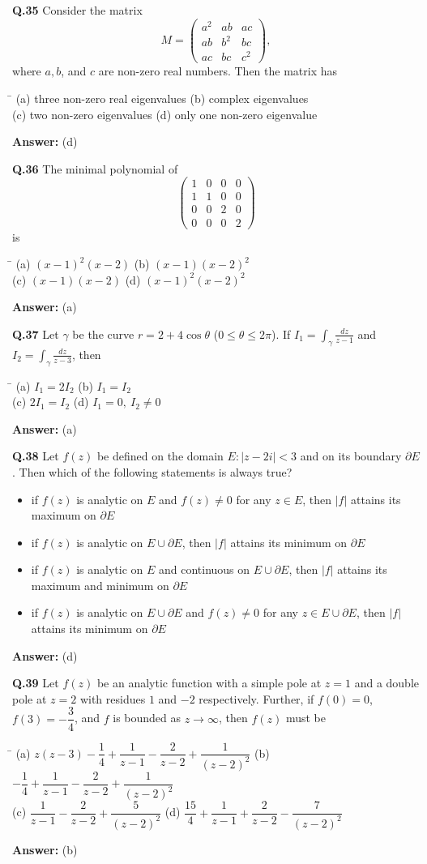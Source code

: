 \documentclass[11pt,a4paper]{article}
\newcommand{\optsfour}[4]{%
  \begin{tabbing}
    \hspace{0.48\linewidth}\=\kill
    (a) #1 \> (b) #2 \\[2pt]
    (c) #3 \> (d) #4
  \end{tabbing}%
}
\newcommand{\optslist}[4]{%
  \begin{itemize}
    \setlength{\itemsep}{2pt}\setlength{\parskip}{0pt}
    \item[(a)] #1
    \item[(b)] #2
    \item[(c)] #3
    \item[(d)] #4
  \end{itemize}%
}
\newcommand{\ans}[1]{\textbf{Answer:} #1\par\medskip}
\begin{document}
\textbf{Q.35} Consider the matrix
\[
  M = \begin{pmatrix}
    a^2 & ab & ac \\
    ab & b^2 & bc \\
    ac & bc & c^2
  \end{pmatrix},
\]
where $a, b$, and $c$ are non-zero real numbers. Then the matrix has
\optsfour{three non-zero real eigenvalues}{complex eigenvalues}{two non-zero eigenvalues}{only one non-zero eigenvalue}
\ans{(d)}

\textbf{Q.36} The minimal polynomial of
\[
  \begin{pmatrix}
    1 & 0 & 0 & 0 \\
    1 & 1 & 0 & 0 \\
    0 & 0 & 2 & 0 \\
    0 & 0 & 0 & 2
  \end{pmatrix}
\]
is
\optsfour{$(x - 1)^2(x - 2)$}{$(x - 1)(x - 2)^2$}{$(x - 1)(x - 2)$}{$(x - 1)^2(x - 2)^2$}
\ans{(a)}

\textbf{Q.37} Let $\gamma$ be the curve $r = 2 + 4\cos\theta$ ($0 \le \theta \le 2\pi$). If $I_1 = \displaystyle\int_\gamma \frac{dz}{z - 1}$ and $I_2 = \displaystyle\int_\gamma \frac{dz}{z - 3}$, then
\optsfour{$I_1 = 2I_2$}{$I_1 = I_2$}{$2I_1 = I_2$}{$I_1 = 0,\ I_2 \ne 0$}
\ans{(a)}

\textbf{Q.38} Let $f(z)$ be defined on the domain $E : |z - 2i| < 3$ and on its boundary $\partial E$. Then which of the following statements is always true?
\optslist{if $f(z)$ is analytic on $E$ and $f(z) \ne 0$ for any $z \in E$, then $|f|$ attains its maximum on $\partial E$}{if $f(z)$ is analytic on $E \cup \partial E$, then $|f|$ attains its minimum on $\partial E$}{if $f(z)$ is analytic on $E$ and continuous on $E \cup \partial E$, then $|f|$ attains its maximum and minimum on $\partial E$}{if $f(z)$ is analytic on $E \cup \partial E$ and $f(z) \ne 0$ for any $z \in E \cup \partial E$, then $|f|$ attains its minimum on $\partial E$}
\ans{(d)}

\textbf{Q.39} Let $f(z)$ be an analytic function with a simple pole at $z = 1$ and a double pole at $z = 2$ with residues $1$ and $-2$ respectively. Further, if $f(0) = 0$, $f(3) = -\dfrac{3}{4}$, and $f$ is bounded as $z \to \infty$, then $f(z)$ must be
\optsfour{$z(z - 3) - \dfrac{1}{4} + \dfrac{1}{z - 1} - \dfrac{2}{z - 2} + \dfrac{1}{(z - 2)^2}$}{$-\dfrac{1}{4} + \dfrac{1}{z - 1} - \dfrac{2}{z - 2} + \dfrac{1}{(z - 2)^2}$}{$\dfrac{1}{z - 1} - \dfrac{2}{z - 2} + \dfrac{5}{(z - 2)^2}$}{$\dfrac{15}{4} + \dfrac{1}{z - 1} + \dfrac{2}{z - 2} - \dfrac{7}{(z - 2)^2}$}
\ans{(b)}
\end{document}
